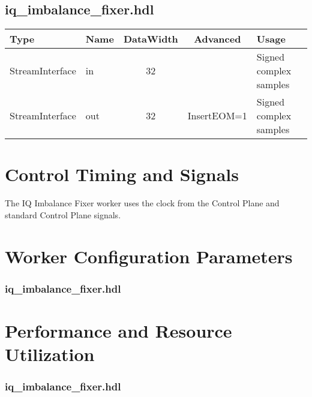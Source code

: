 \documentclass{article}
\def\comp{iq\_imbalance\_fixer}
\edef\ecomp{iq_imbalance_fixer}
\begin{document}
\begin{landscape}
	\subsection*{\comp.hdl}
	\begin{scriptsize}
		\begin{tabular}{|M{2cm}|M{1.5cm}|c|c|M{12cm}|}
			\hline
			Type            & Name & DataWidth & Advanced                & Usage                  \\
			\hline
			StreamInterface & in   & 32        & & Signed complex samples \\
			\hline
			StreamInterface & out  & 32        & InsertEOM=1 & Signed complex samples \\
			\hline
		\end{tabular}
	\end{scriptsize}
\end{landscape}

\section*{Control Timing and Signals}
\begin{flushleft}
The IQ Imbalance Fixer worker uses the clock from the Control Plane and standard Control Plane signals.
\end{flushleft}

\begin{landscape}
\section*{Worker Configuration Parameters}
\subsubsection*{\comp.hdl}
%
\section*{Performance and Resource Utilization}
\subsubsection*{\comp.hdl}
%
\end{landscape}
\end{document}

